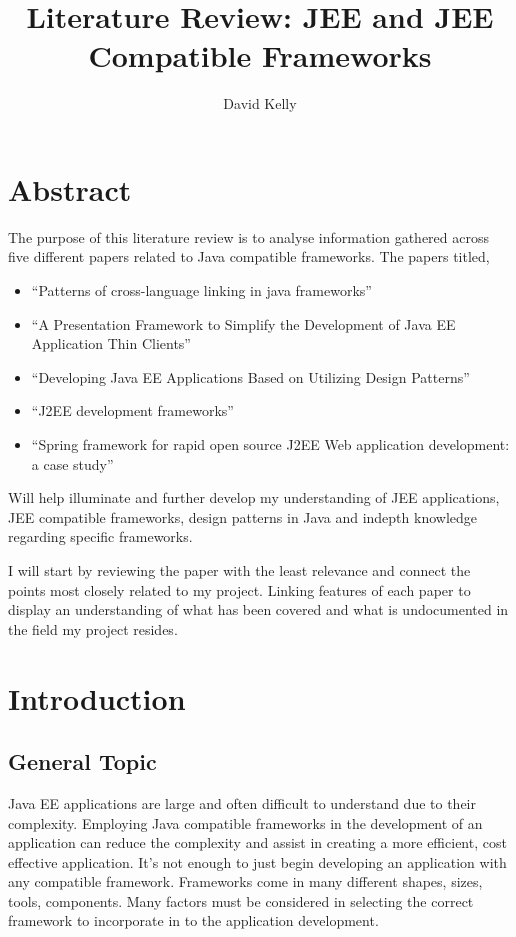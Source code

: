\documentclass{article}
\title{Literature Review: JEE and JEE Compatible Frameworks}
\author{David Kelly}
\date{\parbox{\linewidth}{\centering%
		\today\endgraf\bigskip
		Markus Hofmann \hspace*{3cm} Geraldine Gray\endgraf\medskip
		Dept.\ Informatics and Engineering \endgraf
		Institute of Technology Blanchardstown}}
\begin{document}
\maketitle   %
\thispagestyle{empty}
\newpage
\clearpage
{}
\tableofcontents
\newpage

\section{Abstract}
The purpose of this literature review is to analyse information gathered across five
different papers related to Java compatible frameworks. The papers titled,
	\begin{itemize}
		\item “Patterns of cross-language linking in java frameworks”\cite{patterns} 
		\item “A Presentation Framework to Simplify the Development of Java EE Application Thin Clients”\cite{thin}
		\item “Developing Java EE Applications Based on Utilizing Design Patterns”\cite{designpatterns}
		\item “J2EE development frameworks”\cite{j2ee}
		\item “Spring framework for rapid open source J2EE Web application development: a case study”\cite{spring}
	\end{itemize}

Will help illuminate and further develop my understanding of JEE applications, JEE compatible frameworks, design patterns in Java and indepth knowledge regarding specific frameworks.

I will start by reviewing the paper with the least relevance and connect the points most closely related to my project. Linking features of each paper to display an understanding of what has been covered and what is undocumented in the field my project resides.

\section{Introduction}

	\subsection{General Topic}
	Java EE applications are large and often difficult to understand due to their complexity. Employing Java compatible frameworks in the development of an application can reduce the complexity and assist in creating a more efficient, cost effective application.
	It’s not enough to just begin developing an application with any compatible framework. Frameworks come in many different shapes, sizes, tools, components. Many factors must be considered in selecting the correct framework to incorporate in to the application development. 
\end{document}

